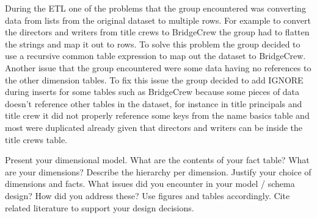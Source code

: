 During the ETL one of the problems that the group encountered was converting data from lists from the original dataset to multiple rows. For example to convert the directors and writers from title crews to BridgeCrew the group had to flatten the strings and map it out to rows. To solve this problem the group decided to use a recursive common table expression to map out the dataset to BridgeCrew. 
\newline
Another issue that the group encountered were some data having no references to the other dimension tables. To fix this issue the group decided to add IGNORE during inserts for some tables such as BridgeCrew because some pieces of data doesn't reference other tables in the dataset, for instance in title principals and title crew it did not properly reference some keys from the name basics table and most were duplicated already given that directors and writers can be inside the title crews table.
\newline





Present your dimensional model. 
What are the contents of your fact table?
What are your dimensions? Describe the hierarchy per dimension.
Justify your choice of dimensions and facts.
What issues did you encounter in your model / schema design? How did you address these?
Use figures and tables accordingly.
Cite related literature to support your design decisions.